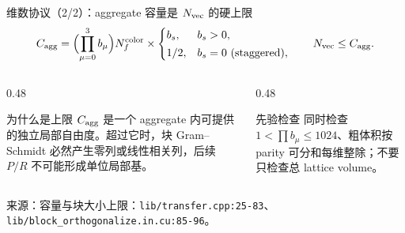 \documentclass[UTF8,aspectratio=169,11pt]{ctexbeamer}
\newcommand{\source}[1]{\vspace{0.05em}\par{\raggedright\scriptsize\color{muted}来源：#1\par}}
\newcommand{\codepath}[1]{\nolinkurl{#1}}
\begin{document}
\begin{frame}[t]{维数协议（2/2）：aggregate 容量是 \(N_{\rm vec}\) 的硬上限}
  \small
  \begin{equation*}
    C_{\rm agg}=\Bigl(\prod_{\mu=0}^{3}b_\mu\Bigr)N_f^{\rm color}
      \times\begin{cases}b_s,&b_s>0,\\[2pt]1/2,&b_s=0\ (\text{staggered}),\end{cases}
    \qquad N_{\rm vec}\le C_{\rm agg}.
  \end{equation*}
  \begin{columns}[T,totalwidth=\textwidth]
    \begin{column}{0.48\textwidth}
      \begin{block}{为什么是上限}
        \(C_{\rm agg}\) 是一个 aggregate 内可提供的独立局部自由度。超过它时，块 Gram--Schmidt 必然产生零列或线性相关列，后续 \(P/R\) 不可能形成单位局部基。
      \end{block}
    \end{column}
    \begin{column}{0.48\textwidth}
      \begin{alertblock}{先验检查}
        同时检查 \(1<\prod b_\mu\le1024\)、粗体积按 parity 可分和每维整除；不要只检查总 lattice volume。
      \end{alertblock}
    \end{column}
  \end{columns}
  \source{容量与块大小上限：\codepath{lib/transfer.cpp:25-83}、\codepath{lib/block_orthogonalize.in.cu:85-96}。}
\end{frame}
\end{document}
